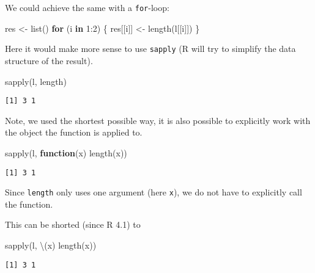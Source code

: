 \documentclass[ignorenonframetext,,t]{beamer}
\let\oldtextbf\textbf
\renewcommand{\textbf}[1]{\textcolor{spamwell}{\oldtextbf{#1}}}
\newenvironment{Shaded}{\begin{snugshade}}{\end{snugshade}}
\newcommand{\ControlFlowTok}[1]{\textcolor[rgb]{0.13,0.29,0.53}{\textbf{#1}}}
\newcommand{\DecValTok}[1]{\textcolor[rgb]{0.00,0.00,0.81}{#1}}
\newcommand{\FunctionTok}[1]{\textcolor[rgb]{0.00,0.00,0.00}{#1}}
\newcommand{\NormalTok}[1]{#1}
\newcommand{\OtherTok}[1]{\textcolor[rgb]{0.56,0.35,0.01}{#1}}
\newcommand{\SpecialCharTok}[1]{\textcolor[rgb]{0.00,0.00,0.00}{#1}}
\begin{document}
\begin{frame}[fragile]
We could achieve the same with a \texttt{for}-loop:

\begin{Shaded}
\begin{Highlighting}[]
\NormalTok{res }\OtherTok{\textless{}{-}} \FunctionTok{list}\NormalTok{()}
\ControlFlowTok{for}\NormalTok{ (i }\ControlFlowTok{in} \DecValTok{1}\SpecialCharTok{:}\DecValTok{2}\NormalTok{) \{}
\NormalTok{  res[[i]] }\OtherTok{\textless{}{-}} \FunctionTok{length}\NormalTok{(l[[i]])}
\NormalTok{\}}
\end{Highlighting}
\end{Shaded}
\end{frame}

\begin{frame}[fragile]
Here it would make more sense to use \texttt{sapply} (R will try to
simplify the data structure of the result).

\begin{Shaded}
\begin{Highlighting}[]
\FunctionTok{sapply}\NormalTok{(l, length)}
\end{Highlighting}
\end{Shaded}

\begin{verbatim}
[1] 3 1
\end{verbatim}
\end{frame}

\begin{frame}[fragile]
Note, we used the shortest possible way, it is also possible to
explicitly work with the object the function is applied to.

\begin{Shaded}
\begin{Highlighting}[]
\FunctionTok{sapply}\NormalTok{(l, }\ControlFlowTok{function}\NormalTok{(x) }\FunctionTok{length}\NormalTok{(x))}
\end{Highlighting}
\end{Shaded}

\begin{verbatim}
[1] 3 1
\end{verbatim}

Since \texttt{length} only uses one argument (here \texttt{x}), we do
not have to explicitly call the function.

This can be shorted (since R 4.1) to

\begin{Shaded}
\begin{Highlighting}[]
\FunctionTok{sapply}\NormalTok{(l, \textbackslash{}(x) }\FunctionTok{length}\NormalTok{(x))}
\end{Highlighting}
\end{Shaded}

\begin{verbatim}
[1] 3 1
\end{verbatim}
\end{frame}
\end{document}
